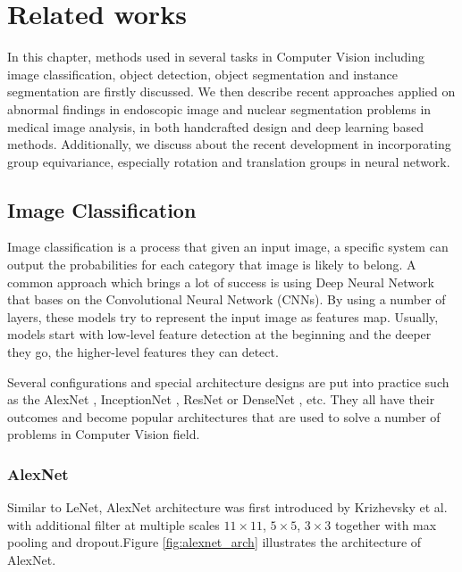 \chapter{Related works}
\label{chap-related-works}
\begin{ChapAbstract}
In this chapter, methods used in several tasks in Computer Vision including image classification, object detection, object segmentation and instance segmentation are firstly discussed. We then describe recent approaches applied on abnormal findings in endoscopic image and nuclear segmentation problems in medical image analysis, in both handcrafted design and deep learning based methods. Additionally, we discuss about the recent development in incorporating group equivariance, especially rotation and translation groups in neural network.

\end{ChapAbstract}
\section{Image Classification}
Image classification is a process that given an input image, a specific system can output the probabilities for each category that image is likely to belong. A common approach which brings a lot of success is using Deep Neural Network that bases on the Convolutional Neural Network (CNNs). By using a number of layers, these models try to represent the input image as features map. Usually, models start with low-level feature detection at the beginning and the deeper they go, the higher-level features they can detect. 

Several configurations and special architecture designs are put into practice such as the AlexNet \cite{AlexNet}, InceptionNet \cite{inception}, ResNet \cite{Resnet} or DenseNet \cite{DenseNet}, etc. They all have their outcomes and become popular architectures that are used to solve a number of problems in Computer Vision field.  

\pagebreak
\subsection{AlexNet}
Similar to LeNet, AlexNet \cite{AlexNet} architecture was first introduced by Krizhevsky et al. with additional filter at multiple scales $11\times11$, $5\times5$, $3\times3$ together with max pooling and dropout.Figure \ref{fig:alexnet_arch} illustrates the architecture of AlexNet.

